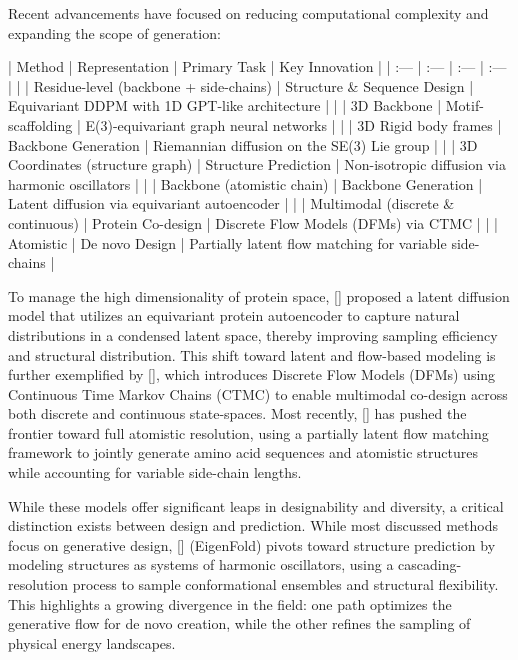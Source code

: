 \documentclass[11pt]{article}
\begin{document}
Recent advancements have focused on reducing computational complexity and expanding the scope of generation:

| Method | Representation | Primary Task | Key Innovation |
| :--- | :--- | :--- | :--- |
| \citep{2205.15019} | Residue-level (backbone + side-chains) | Structure \& Sequence Design | Equivariant DDPM with 1D GPT-like architecture |
| \citep{2206.04119} | 3D Backbone | Motif-scaffolding | E(3)-equivariant graph neural networks |
| \citep{2302.02277} | 3D Rigid body frames | Backbone Generation | Riemannian diffusion on the SE(3) Lie group |
| \citep{2304.02198} | 3D Coordinates (structure graph) | Structure Prediction | Non-isotropic diffusion via harmonic oscillators |
| \citep{2305.04120} | Backbone (atomistic chain) | Backbone Generation | Latent diffusion via equivariant autoencoder |
| \citep{2402.04997} | Multimodal (discrete \& continuous) | Protein Co-design | Discrete Flow Models (DFMs) via CTMC |
| \citep{2507.09466} | Atomistic | De novo Design | Partially latent flow matching for variable side-chains |

To manage the high dimensionality of protein space, [\citep{2305.04120}] proposed a latent diffusion model that utilizes an equivariant protein autoencoder to capture natural distributions in a condensed latent space, thereby improving sampling efficiency and structural distribution. This shift toward latent and flow-based modeling is further exemplified by [\citep{2402.04997}], which introduces Discrete Flow Models (DFMs) using Continuous Time Markov Chains (CTMC) to enable multimodal co-design across both discrete and continuous state-spaces. Most recently, [\citep{2507.09466}] has pushed the frontier toward full atomistic resolution, using a partially latent flow matching framework to jointly generate amino acid sequences and atomistic structures while accounting for variable side-chain lengths.

While these models offer significant leaps in designability and diversity, a critical distinction exists between design and prediction. While most discussed methods focus on generative design, [\citep{2304.02198}] (EigenFold) pivots toward structure prediction by modeling structures as systems of harmonic oscillators, using a cascading-resolution process to sample conformational ensembles and structural flexibility. This highlights a growing divergence in the field: one path optimizes the generative flow for de novo creation, while the other refines the sampling of physical energy landscapes.
\end{document}
